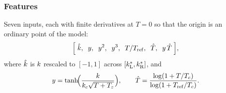 \subsubsection*{Features}

Seven inputs, each with finite derivatives at $T=0$ so that the origin is an ordinary point of the
model:
\begin{equation}\label{eq:features}
  \Bigl[\;\hat{k},\;\; y,\;\; y^{2},\;\; y^{3},\;\; T/T_{\mathrm{ref}},\;\;
  \hat{T},\;\; y\,\hat{T}\;\Bigr],
\end{equation}
where $\hat{k}$ is $k$ rescaled to $[-1,1]$ across
$[k^{*}_{\mathrm{L}},k^{*}_{\mathrm{R}}]$, and
\begin{equation}\label{eq:featuredefs}
  y=\tanh\!\Bigl(\frac{k}{k_{c}\sqrt{T+T_{z}}}\Bigr),
  \qquad
  \hat{T}=\frac{\log(1+T/T_{c})}{\log(1+T_{\mathrm{ref}}/T_{c})} .
\end{equation}


